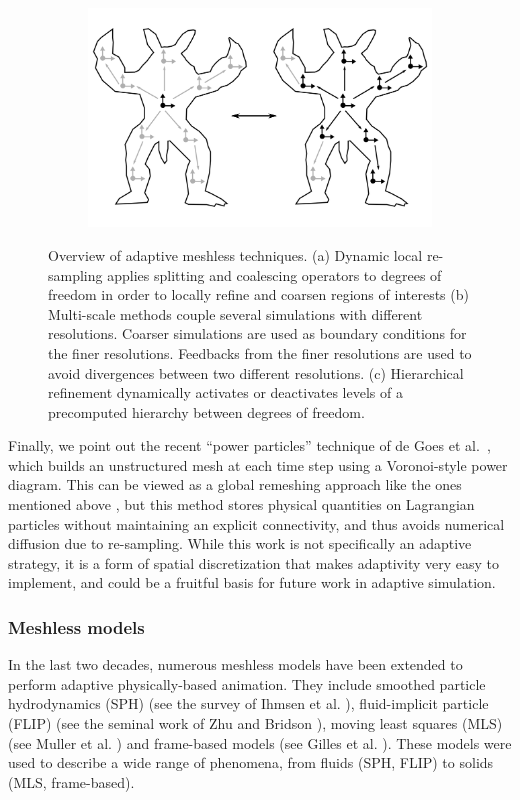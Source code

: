 \begin{figure}[t]
\begin{subfigure}[b]{0.3\linewidth}
\includegraphics[width=\linewidth]{images/starAdaptivity-cgf2016/particles-hierarchy.png}
\caption{\label{fig:meshless-hierarchy}}
\end{subfigure}
\caption[STAR adaptivity: Meshless techniques]{\label{fig:particleOverview}
Overview of adaptive meshless techniques.
(a) Dynamic local re-sampling applies splitting and coalescing operators to degrees of freedom in order to locally refine and coarsen regions of interests (b) Multi-scale methods couple several simulations with different resolutions. Coarser simulations are used as boundary conditions for the finer resolutions. Feedbacks from the finer resolutions are used to avoid divergences between two different resolutions. (c) Hierarchical refinement dynamically activates or deactivates levels of a precomputed hierarchy between degrees of freedom.}
\end{figure}


Finally, we point out the recent ``power particles'' technique of de Goes et al.~\cite{deGoes2015}, which builds an unstructured mesh at each time step using a Voronoi-style power diagram.
This can be viewed as a global remeshing approach like the ones mentioned above \cite{Klingner2006,Bargteil2007}, but this method stores physical quantities on Lagrangian particles without maintaining an explicit connectivity, and thus avoids numerical diffusion due to re-sampling.
While this work is not specifically an adaptive strategy, it is a form of spatial discretization that makes adaptivity very easy to implement, and could be a fruitful basis for future work in adaptive simulation.

\subsubsection{Meshless models}
\label{sec:meshless}
In the last two decades, numerous meshless models have been extended to perform adaptive physically-based animation. They include smoothed particle hydrodynamics (SPH) (see the survey of Ihmsen et al. \cite{Ihmsen2014:STAR}), fluid-implicit particle (FLIP) (see the seminal work of Zhu and Bridson \cite{Zhu2005}), moving least squares (MLS) (see Muller et al. \cite{Muller2004:melting}) and frame-based models (see Gilles et al. \cite{Gilles2011}). These models were used to describe a wide range of phenomena, from fluids (SPH, FLIP) to solids (MLS, frame-based).

